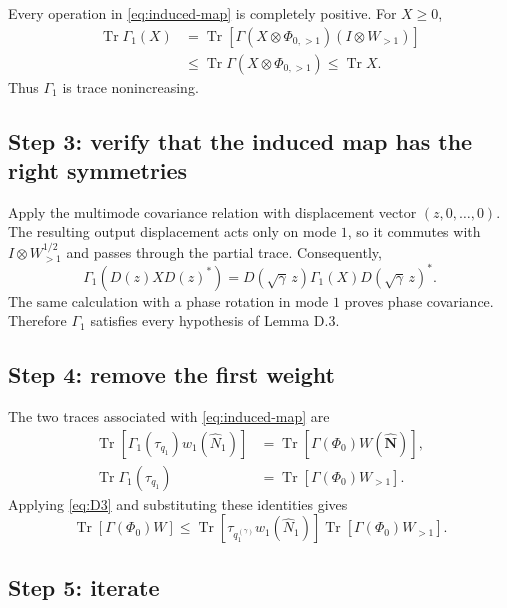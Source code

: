 \documentclass[11pt]{article}
\newcommand{\Tr}{\operatorname{Tr}}
\begin{document}
Every operation in \eqref{eq:induced-map} is completely positive.  For
$X\geq0$,
\begin{align*}
  \Tr\Gamma_1(X)
  &=\Tr\!\left[\Gamma(X\otimes\Phi_{0,>1})
                 (I\otimes W_{>1})\right]\\
  &\leq\Tr\Gamma(X\otimes\Phi_{0,>1})
   \leq\Tr X.
\end{align*}
Thus $\Gamma_1$ is trace nonincreasing.

\subsection*{Step 3: verify that the induced map has the right symmetries}

Apply the multimode covariance relation with displacement vector
$(z,0,\ldots,0)$.  The resulting output displacement acts only on mode $1$,
so it commutes with $I\otimes W_{>1}^{1/2}$ and passes through the partial
trace.  Consequently,
\[
  \Gamma_1(D(z)XD(z)^*)
  =D(\sqrt\gamma\,z)\Gamma_1(X)D(\sqrt\gamma\,z)^*.
\]
The same calculation with a phase rotation in mode $1$ proves phase
covariance.  Therefore $\Gamma_1$ satisfies every hypothesis of Lemma D.3.

\subsection*{Step 4: remove the first weight}

The two traces associated with \eqref{eq:induced-map} are
\begin{align}
  \Tr[\Gamma_1(\tau_{q_1})w_1(\widehat N_1)]
  &=\Tr[\Gamma(\Phi_0)W(\widehat{\mathbf N})],
  \label{eq:left-id}\\
  \Tr\Gamma_1(\tau_{q_1})
  &=\Tr[\Gamma(\Phi_0)W_{>1}].
  \label{eq:mass-id}
\end{align}
Applying \eqref{eq:D3} and substituting these identities gives
\begin{equation}\label{eq:strip-one}
  \Tr[\Gamma(\Phi_0)W]
  \leq
  \Tr[\tau_{q_1^{(\gamma)}}w_1(\widehat N_1)]
  \Tr[\Gamma(\Phi_0)W_{>1}].
\end{equation}

\subsection*{Step 5: iterate}
\end{document}
